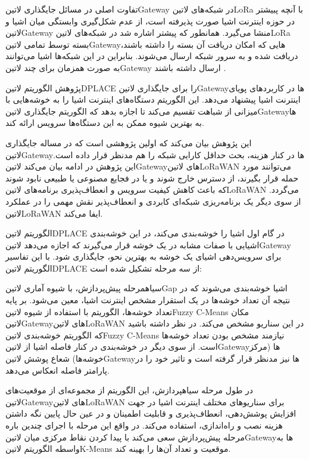 تفاوت اصلی در مسائل جایگذاری ‌لاتین{Gateway} در شبکه‌های ‌لاتین{LoRa} با آنچه پبیشتر در حوزه اینترنت اشیا صورت پذیرفته است،
از عدم شکل‌گیری وابستگی میان اشیا و ‌لاتین{Gateway} منشا می‌گیرد. همانطور که پیشتر اشاره شد در شبکه‌های ‌لاتین{LoRa}
بسته توسط تمامی ‌لاتین{Gateway}هایی که امکان دریافت آن بسته را داشته باشند، دریافت شده و به سرور شبکه ارسال می‌شوند.
بنابراین در این شبکه‌ها اشیا می‌توانند به صورت همزمان برای چند ‌لاتین{Gateway} ارسال داشته باشند
.


پژوهش  الگوریتم ‌لاتین{DPLACE} را برای جایگذاری ‌لاتین{Gateway}ها در کاربردهای پویای اینترنت اشیا پیشنهاد می‌دهد.
این الگوریتم دستگاه‌های اینترنت اشیا را به خوشه‌هایی با میزانی از شباهت تقسیم می‌کند تا اجازه بدهد که الگوریتم جایگذاری ‌لاتین{Gateway}ها
به بهترین شیوه ممکن به این دستگاه‌ها سرویس ارائه کند.

این پژوهش بیان می‌کند که اولین پژوهشی است که در مساله جایگذاری ‌لاتین{Gateway}ها در کنار هزینه، بحث حداقل کارایی شبکه را هم مدنظر
قرار داده است. این پژوهش در ادامه بیان می‌کند ‌لاتین{Gateway}های ‌لاتین{LoRaWAN} می‌توانند مورد حمله قرار بگیرند، از دسترس خارج شوند
و یا در فجایع مصنوعی یا طبیعی نابود شوند که باعث کاهش کیفیت سرویس و انعطاف‌پذیری برنامه‌های ‌لاتین{LoRaWAN} می‌گردد.
از سوی دیگر یک برنامه‌ریزی شبکه‌ای کابردی و انعطاف‌پذیر نقش مهمی را در عملکرد ‌لاتین{LoRaWAN} ایفا می‌کند.

الگوریتم ‌لاتین{DPLACE} در گام اول اشیا را خوشه‌بندی می‌کند، در این خوشه‌بندی اشیایی با صفات مشابه در یک خوشه قرار می‌گیرند که اجازه می‌دهد
‌لاتین{Gateway} برای سرویس‌دهی اشیای یک خوشه به بهترین نحو، جایگذاری شود. با این تفاسیر الگوریتم ‌لاتین{DPLACE} از سه مرحله تشکیل شده است:


 ‌سیاه{مرحله پیش‌پردازش}، با شیوه آماری ‌لاتین{Gap} اشیا خوشه‌بندی می‌شوند که در نتیجه آن تعداد خوشه‌ها در یک استقرار مشخص اینترنت اشیا، معین می‌شود.
بر پایه تعداد خوشه‌ها، الگوریتم با استفاده از شیوه ‌لاتین{Fuzzy C-Means} مکان ‌لاتین{Gateway}های ‌لاتین{LoRaWAN} در این سناریو مشخص می‌کند.
در نظر داشته باشید که الگوریتم خوشه‌بندی ‌لاتین{Fuzzy C-Means} نیازمند مشخص بودن تعداد خوشه‌ها است. از سوی دیگر در خوشه‌بندی در کنار فاصله اشیا
از ‌لاتین{Gateway}ها (مرکز خوشه‌ها) شعاع پوشش ‌لاتین{Gateway}ها نیز مدنظر قرار گرفته است و تاثیر خود را در پارامتر فاصله انعکاس می‌دهد.

 در طول مرحله ‌سیاه{پردازش}، این الگوریتم از مجموعه‌ای از موقعیت‌های ‌لاتین{Gateway}های ‌لاتین{LoRaWAN} برای سناریوهای مختلف اینترنت اشیا
در جهت افزایش پوشش‌دهی، انعطاف‌پذیری و قابلیت اطمینان و در عین حال پایین نگه داشتن هزینه نصب و راه‌اندازی، استفاده می‌کند.
در واقع این مرحله با اجرای چندین باره مرحله پیش‌پردازش سعی می‌کند با پیدا کردن نقاط مرکزی میان ‌لاتین{Gateway}ها
به واسطه الگوریتم ‌لاتین{K-Means} موقعیت و تعداد آن‌ها را بهینه کند.

